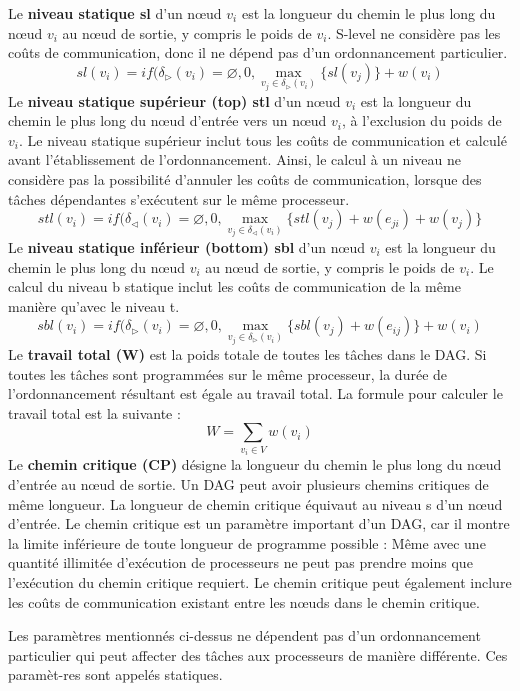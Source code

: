 Le \textbf{niveau statique sl} d'un nœud $v_i$ est la longueur du chemin le plus long du nœud $v_i$ au nœud de sortie, y compris le poids de $v_i$. 
S-level ne considère pas les coûts de communication, donc il ne dépend pas d'un ordonnancement particulier. 
%
$$
sl(v_i) = if(\delta_\triangleright(v_i) = \varnothing , 0 , \max_{ v_j \in \delta_\triangleright(v_i)}\{ sl(v_j) \} + w(v_i)
$$
%
Le \textbf{niveau statique supérieur (top) stl} d'un nœud $v_i$ est la longueur du chemin le plus long du nœud d'entrée vers un nœud $v_i$, à l'exclusion du poids de $v_i$. 
Le niveau statique supérieur inclut tous les coûts de communication et calculé avant l'établissement de l'ordonnancement. 
Ainsi, le calcul à un niveau ne considère pas la possibilité d'annuler les coûts de communication, lorsque des tâches dépendantes s'exécutent sur le même processeur. 
%
$$
stl(v_i) = if(\delta_\triangleleft(v_i) = \varnothing , 0 , \max_{ v_j \in \delta_\triangleleft(v_i)}\{ stl(v_j) + w(e_{ji})  + w(v_j) \}
$$
%
Le \textbf{niveau statique inférieur (bottom) sbl} d'un nœud $v_i$ est la longueur du chemin le plus long du nœud $v_i$ au nœud de sortie, y compris le poids de $v_i$. 
Le calcul du niveau b statique inclut les coûts de communication de la même manière qu'avec le niveau t. 
%
$$
sbl(v_i) = if(\delta_\triangleright(v_i) = \varnothing , 0 , \max_{ v_j \in \delta_\triangleright(v_i)}\{ sbl(v_j) + w(e_{ij}) \} + w(v_i)
$$
%
Le \textbf{travail total (W)} est la poids totale de toutes les tâches dans le DAG. 
Si toutes les tâches sont programmées sur le même processeur, la durée de l'ordonnancement résultant est égale au travail total. 
La formule pour calculer le travail total est la suivante :
%
$$
W = \sum_{ v_i \in V} w(v_i)
$$
%
Le \textbf{chemin critique (CP)} désigne la longueur du chemin le plus long du nœud d'entrée au nœud de sortie. 
Un DAG peut avoir plusieurs chemins critiques de même longueur. 
La longueur de chemin critique équivaut au niveau s d'un nœud d'entrée. 
Le chemin critique est un paramètre important d'un DAG, car il montre la limite inférieure de toute longueur de programme possible : 
Même avec une quantité illimitée d'exécution de processeurs ne peut pas prendre moins que l'exécution du chemin critique requiert. 
Le chemin critique peut également inclure les coûts de communication existant entre les nœuds dans le chemin critique. 

Les paramètres mentionnés ci-dessus ne dépendent pas d'un ordonnancement particulier qui peut affecter des tâches aux processeurs de manière différente. 
Ces paramèt-res sont appelés statiques. 
%
